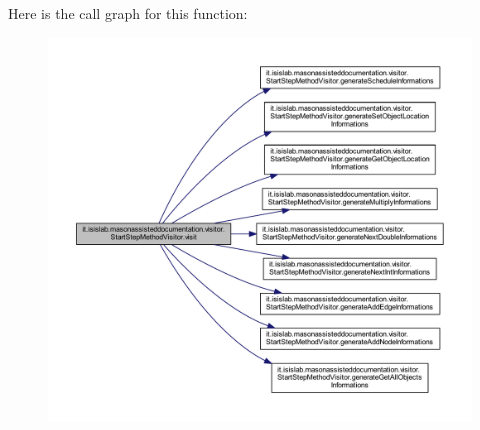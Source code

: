 Here is the call graph for this function\-:\nopagebreak
\begin{figure}[H]
\begin{center}
\leavevmode
\includegraphics[width=350pt]{classit_1_1isislab_1_1masonassisteddocumentation_1_1visitor_1_1_start_step_method_visitor_a4796e11f1a29fb12db6f9500eac5adeb_cgraph}
\end{center}
\end{figure}




